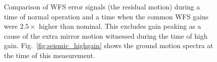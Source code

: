 \begin{figure}
\begin{centering}
\caption[Comparison of WFS error signals (the residual motion) during
a time of normal operation and a time when the common WFS gains were
$2.5\times$ higher than nominal]{Comparison of WFS error signals (the
  residual motion) during a time of normal operation and a time when
  the common WFS gains were $2.5\times$ higher than nominal. This
  excludes gain peaking as a cause of the extra mirror motion
  witnessed during the time of high
  gain. Fig.~\ref{fig:seismic_highgain} shows the ground motion
  spectra at the time of this measurement.}
\label{fig:WFS_inputbeam}
\end{centering}
\end{figure}










